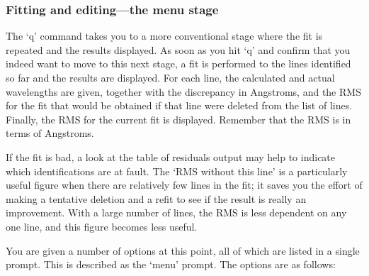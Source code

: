 \documentclass[11pt,twoside]{article}
\newcommand{\latorhtm}[2]{#1}
\newcommand{\latorhtm}[2]{#2}
\begin{document}

\subsubsection{\label{techno10menu}Fitting and editing\latorhtm{---}{-}the
   menu stage}

   The `q' command takes you to a more conventional stage where the fit
   is repeated and the results displayed.  As soon as you hit `q' and
   confirm that you indeed want to move to this next stage, a fit is
   performed to the lines identified so far and the results are
   displayed.  For each line, the calculated and actual wavelengths are
   given, together with the discrepancy in Angstroms, and the RMS for
   the fit that would be obtained if that line were deleted from the
   list of lines.  Finally, the RMS for the current fit is displayed.
   Remember that the RMS is in terms of Angstroms.

   If the fit is bad, a look at the table of residuals output may help
   to indicate which identifications are at fault. The `RMS without this
   line' is a particularly useful figure when there are relatively few
   lines in the fit; it saves you the effort of making a tentative
   deletion and a refit to see if the result is really an improvement.
   With a large number of lines, the RMS is less dependent on any one
   line, and this figure becomes less useful.

   You are given a number of options at this point, all of which are
   listed in a single prompt.  This is described as the `menu' prompt.
   The options are as follows:
\end{document}
